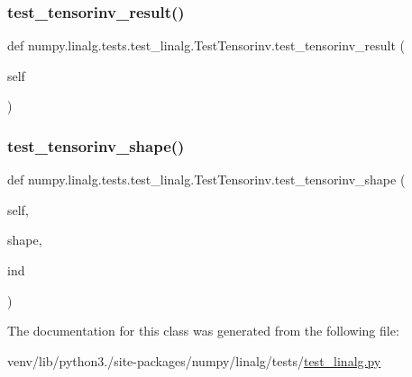 \subsubsection{\texorpdfstring{test\+\_\+tensorinv\+\_\+result()}{test\_tensorinv\_result()}}
{\footnotesize\ttfamily def numpy.\+linalg.\+tests.\+test\+\_\+linalg.\+Test\+Tensorinv.\+test\+\_\+tensorinv\+\_\+result (\begin{DoxyParamCaption}\item[{}]{self }\end{DoxyParamCaption})}

\mbox{\label{classnumpy_1_1linalg_1_1tests_1_1test__linalg_1_1TestTensorinv_a88720560bc3756a6921b80b0d8b42b75}} 
\subsubsection{\texorpdfstring{test\+\_\+tensorinv\+\_\+shape()}{test\_tensorinv\_shape()}}
{\footnotesize\ttfamily def numpy.\+linalg.\+tests.\+test\+\_\+linalg.\+Test\+Tensorinv.\+test\+\_\+tensorinv\+\_\+shape (\begin{DoxyParamCaption}\item[{}]{self,  }\item[{}]{shape,  }\item[{}]{ind }\end{DoxyParamCaption})}



The documentation for this class was generated from the following file\+:\begin{DoxyCompactItemize}
\item 
venv/lib/python3./site-\/packages/numpy/linalg/tests/\hyperlink{test__linalg_8py}{test\+\_\+linalg.\+py}\end{DoxyCompactItemize}
